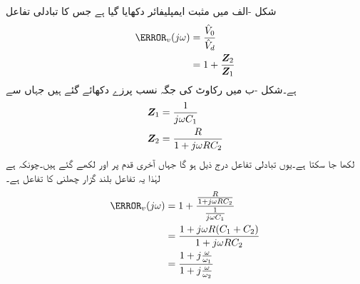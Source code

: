 شکل -الف میں مثبت ایمپلیفائر دکھایا گیا ہے جس کا تبادلی تفاعل
\begin{align*}
\A_v(j\omega)&=\frac{\hat{V}_0}{\hat{V}_d}\\
&=1+\frac{\bZ_2}{\bZ_1}
\end{align*}
ہے۔شکل -ب میں رکاوٹ کی جگہ نسب پرزے دکھائے گئے ہیں جہاں سے 
\begin{align*}
{\ensuremath{{\boldsymbol{Z}}}}_1&=\frac{1}{j\omega C_1}\\
{{\boldsymbol{Z}}}_2&=\frac{R}{1+j\omega R C_2}
\end{align*}
لکھا جا سکتا ہے۔یوں تبادلی تفاعل درج ذیل ہو گا جہاں آخری قدم پر  اور  لکھے گئے ہیں۔چونکہ  ہے لہٰذا یہ تفاعل بلند گزار چھلنی کا تفاعل ہے۔
\begin{align*}
\A_v(j\omega)&=1+\frac{\frac{R}{1+j\omega R C_2}}{\frac{1}{j\omega C_1}}\\
&=\frac{1+j\omega R(C_1+C_2)}{1+j\omega R C_2}\\
&=\frac{1+j\frac{\omega}{\omega_1} }{1+j\frac{\omega}{\omega_2}}
\end{align*}
%
